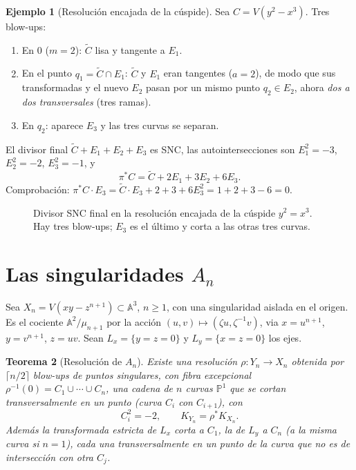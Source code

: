 \documentclass[11pt,a4paper,oneside]{book}
\newcommand{\A}{\mathbb{A}}
\newcommand{\PP}{\mathbb{P}}
\theoremstyle{plain}
\newtheorem{teorema}{Teorema}[chapter]
\theoremstyle{definition}
\newtheorem{ejemplo}[teorema]{Ejemplo}
\theoremstyle{remark}
\begin{document}
\begin{ejemplo}[Resolución encajada de la cúspide]\label{ej:cuspide-encajada}
Sea $C=V(y^2-x^3)$. Tres blow-ups:
\begin{enumerate}[label=(\roman*)]
\item En $0$ ($m=2$): $\tilde C$ lisa y tangente a $E_1$.
\item En el punto $q_1=\tilde C\cap E_1$: $\tilde C$ y $E_1$ eran tangentes ($a=2$), de modo que sus transformadas y el nuevo $E_2$ pasan por un mismo punto $q_2\in E_2$, ahora \emph{dos a dos transversales} (tres ramas).
\item En $q_2$: aparece $E_3$ y las tres curvas se separan.
\end{enumerate}
El divisor final $\tilde C+E_1+E_2+E_3$ es SNC, las autointersecciones son $E_1^2=-3$, $E_2^2=-2$, $E_3^2=-1$, y
\[
\pi^*C=\tilde C+2E_1+3E_2+6E_3 .
\]
Comprobación: $\pi^*C\cdot E_3=\tilde C\cdot E_3+2+3+6E_3^2=1+2+3-6=0$.
\begin{figure}[ht]
\centering
{}
\caption{Divisor SNC final en la resolución encajada de la cúspide $y^2=x^3$. Hay tres blow-ups; $E_3$ es el último y corta a las otras tres curvas.}
\label{fig:cuspide}
\end{figure}
\end{ejemplo}

\section{Las singularidades $A_n$}\label{sec:An}

Sea $X_n=V(xy-z^{n+1})\subset\A^3$, $n\ge1$, con una singularidad aislada en el origen. Es el cociente $\A^2/\mu_{n+1}$ por la acción $(u,v)\mapsto(\zeta u,\zeta^{-1}v)$, via $x=u^{n+1}$, $y=v^{n+1}$, $z=uv$. Sean $L_x=\{y=z=0\}$ y $L_y=\{x=z=0\}$ los ejes.

\begin{teorema}[Resolución de $A_n$]\label{teo:An}
Existe una resolución $\rho:Y_n\to X_n$ obtenida por $\lceil n/2\rceil$ blow-ups de puntos singulares, con fibra excepcional $\rho^{-1}(0)=C_1\cup\cdots\cup C_n$, una cadena de $n$ curvas $\PP^1$ que se cortan transversalmente en un punto (curva $C_i$ con $C_{i+1}$), con
\[
C_i^2=-2,\qquad K_{Y_n}=\rho^*K_{X_n}.
\]
Además la transformada estricta de $L_x$ corta a $C_1$, la de $L_y$ a $C_n$ (a la misma curva si $n=1$), cada una transversalmente en un punto de la curva que no es de intersección con otra $C_j$.
\end{teorema}
\end{document}
